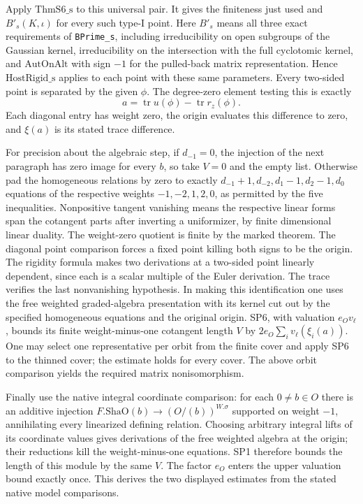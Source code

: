 Apply $\mathrm{ThmS6\_s}$ to this universal pair. It gives the
finiteness just used and $B'_s(K,\iota)$ for every such type-I
point. Here $B'_s$ means all three exact requirements of
\texttt{BPrime\_s}, including irreducibility on open subgroups
of the Gaussian kernel, irreducibility on the intersection
with the full cyclotomic kernel, and $\mathrm{AutOnAlt}$ with
sign $-1$ for the pulled-back matrix representation. Hence
$\mathrm{HostRigid\_s}$ applies to each point with these same
parameters. Every two-sided point is separated by the
given $\phi$. The degree-zero element testing this is exactly
\[
 a=\operatorname{tr}u(\phi)-\operatorname{tr}r_z(\phi).
\]
Each diagonal entry has weight zero, the origin evaluates this
difference to zero, and $\xi(a)$ is its stated trace difference.

For precision about the algebraic step, if $d_{-1}=0$, the
injection of the next paragraph has zero image for every $b$,
so take $V=0$ and the empty list. Otherwise pad the homogeneous
relations by zero to exactly $d_{-1}+1,d_{-2},d_1-1,d_2-1,d_0$ equations of the respective weights $-1,-2,1,2,0$, as permitted by the five inequalities.
Nonpositive tangent vanishing means the respective linear forms
span the cotangent parts after inverting a uniformizer, by finite
dimensional linear duality. The weight-zero quotient is finite by
the marked theorem. The diagonal point comparison forces a fixed
point killing both signs to be the origin. The rigidity formula makes
two derivations at a two-sided point linearly dependent, since each
is a scalar multiple of the Euler derivation. The trace verifies the
last nonvanishing hypothesis. In making this identification one uses
the free weighted graded-algebra presentation with its kernel cut
out by the specified homogeneous equations and the original origin.
SP6, with valuation $e_O v_\ell$, bounds its finite weight-minus-one
cotangent length $V$ by $2 e_O\sum_i v_\ell(\xi_i(a))$. One may select
one representative per orbit from the finite cover and apply SP6
to the thinned cover; the estimate holds for every cover. The above
orbit comparison yields the required matrix nonisomorphism.

Finally use the native integral coordinate comparison: for each
$0\ne b\in O$ there is an additive injection
$F.\mathrm{ShaO}(b)\to(O/(b))^{W.\sigma}$ supported on weight
$-1$, annihilating every linearized defining relation. Choosing
arbitrary integral lifts of its coordinate values gives derivations
of the free weighted algebra at the origin; their reductions kill
the weight-minus-one equations. SP1 therefore bounds the length
of this module by the same $V$. The factor $e_O$ enters the upper
valuation bound exactly once. This derives the two displayed estimates
from the stated native model comparisons.

